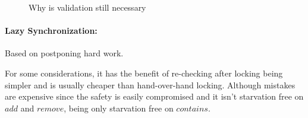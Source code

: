 \begin{figure}[h]
    \begin{minipage}{0.5\textwidth}
        \centering
    \end{minipage}
    \begin{minipage}{0.5\textwidth}
        \centering
    \end{minipage}
    \caption{Why is validation still necessary}
    \label{fig:lazysync1}
\end{figure}
\paragraph{Lazy Synchronization:} Based on postponing hard work.
\par For some considerations, it has the benefit of re-checking after locking being simpler and is usually cheaper than hand-over-hand locking. Although mistakes are expensive since the safety is easily compromised and it isn't starvation free on $add$ and $remove$, being only starvation free on $contains$.